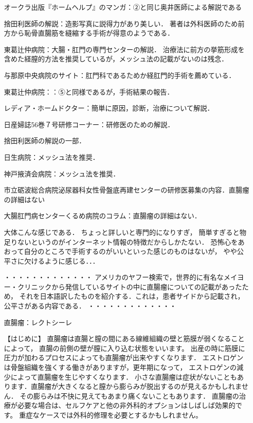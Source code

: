 オークラ出版『ホームヘルプ』のマンガ：②と同じ奥井医師による解説である

捨田利医師の解説：造影写真に説得力があり美しい．
著者は外科医師のため前方から恥骨直腸筋を縫縮する手術が得意のようである．

東葛辻仲病院：大腸・肛門の専門センターの解説．
治療法に前方の挙筋形成を含めた経膣的方法を推奨しているが，メッシュ法の記載がないのは残念．

与那原中央病院のサイト：肛門科であるためか経肛門的手術を薦めている．

東葛辻仲病院：：⑤と同様であるが，手術結果の報告．

レディア・ホームドクター：簡単に原因，診断，治療について解説．

日産婦誌56巻７号研修コーナー：研修医のための解説．

捨田利医師の解説の一部．

日生病院：メッシュ法を推奨．

神戸掖済会病院：メッシュ法を推奨．

市立砺波総合病院泌尿器科女性骨盤底再建センターの研修医募集の内容．直腸瘤の詳細はない

大腸肛門病センターくるめ病院のコラム：直腸瘤の詳細はない．


大体こんな感じである．
ちょっと詳しいと専門的になりすぎ，
簡単すぎると物足りないというのがインターネット情報の特徴だからしかたない．
恐怖心をあおって自分のところで手術するのがいいといった感じのものはないが，
やや公平さに欠けるように感じる．．．

・・・・・・・・・・・・・
アメリカのヤフー検索で，世界的に有名なメイヨー・クリニックから発信しているサイトの中に直腸瘤についての記載があったため，
それを日本語訳したものを紹介する．これは，患者サイドから記載され，公平さがある内容である．
・・・・・・・・・・・・・

直腸瘤：レクトシーレ

【はじめに】
直腸瘤は直腸と膣の間にある線維組織の壁と筋膜が弱くなることによって，
直腸の前側の壁が膣に入り込む状態をいいます。
出産の時に筋膜に圧力が加わるプロセスによっても直腸瘤が出来やすくなります．
エストロゲンは骨盤組織を強くする働きがありますが，更年期になって，
エストロゲンの減少によって直腸瘤を生じやすくなります．
小さな直腸瘤は症状がないこともあります．直腸瘤が大きくなると膣から膨らみが脱出するのが見えるかもしれません．
その膨らみは不快に見えてもあまり痛くないこともあります．
直腸瘤の治療が必要な場合は、セルフケアと他の非外科的オプションはしばしば効果的です。
重症なケースでは外科的修理を必要とするかもしれません。

